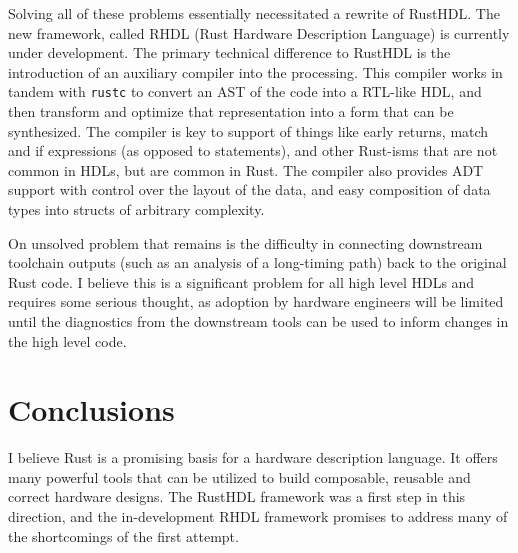 \documentclass[sigplan,screen,sigconf]{acmart}
\begin{document}
Solving all of these problems essentially necessitated a rewrite of RustHDL.  The
new framework, called RHDL (Rust Hardware Description Language) is currently under development.  
The primary technical difference to RustHDL is the introduction of an auxiliary compiler into 
the processing. This compiler works in tandem with \verb|rustc| to convert an AST of the code 
into a RTL-like HDL, and then transform and optimize that representation into a form that can
be synthesized.  The  compiler is key to support of things like early returns, match and 
if expressions (as opposed to statements), and other Rust-isms that are not common in
HDLs, but are common in Rust.  The compiler also provides ADT support with control 
over the layout of the data, and easy composition of data types into structs of arbitrary complexity.  

\begin{tcolorbox}
On unsolved problem that remains is the difficulty in connecting downstream toolchain
outputs (such as an analysis of a long-timing path) back to the original Rust code.  I believe
this is a significant problem for all high level HDLs and requires some serious thought, as
adoption by hardware engineers will be limited until the diagnostics from the downstream tools 
can be used to inform changes in the high level code.
\end{tcolorbox}

\section{Conclusions}
I believe Rust is a promising basis for a hardware description language.  It offers many powerful 
tools that can be utilized to build composable, reusable and correct hardware designs.  The RustHDL 
framework was a first step in this direction, and the in-development RHDL framework promises to address
many of the shortcomings of the first attempt.

\newpage
\end{document}
